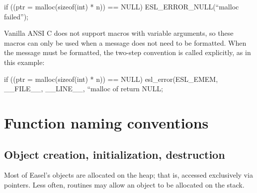 \documentclass[11pt]{article}
\begin{document}
\begin{cchunk}
if ((ptr = malloc(sizeof(int) * n)) == NULL) ESL_ERROR_NULL(``malloc failed'');
\end{cchunk}

Vanilla ANSI C does not support macros with variable arguments, so
these macros can only be used when a message does not need to be
formatted. When the message must be formatted, the two-step convention
is called explicitly, as in this example:

\begin{cchunk}
if ((ptr = malloc(sizeof(int) * n)) == NULL)
  {
     esl_error(ESL_EMEM, __FILE__, __LINE__, ``malloc of %
     return NULL;
  }
\end{cchunk}






\section{Function naming conventions}

\subsection{Object creation, initialization, destruction}

Most of Easel's objects are allocated on the heap; that is, accessed
exclusively via pointers. Less often, routines may allow an object to
be allocated on the stack.
\end{document}
